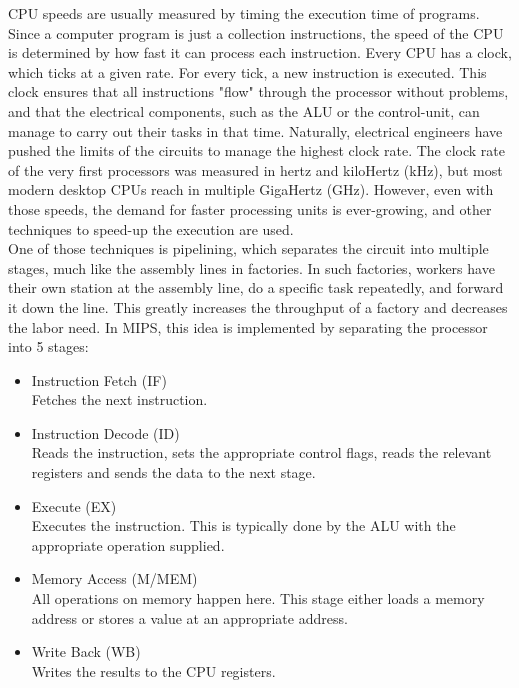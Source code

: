 CPU speeds are usually measured by timing the execution time of programs. Since
a computer program is just a collection instructions, the speed of the CPU is
determined by how fast it can process each instruction.
Every CPU has a clock, which ticks at a given rate. For every tick, a new
instruction is executed. This clock ensures that all instructions "flow" through
the processor without problems, and that the electrical components, such as the
ALU or the control-unit, can manage to carry out their tasks in that time.
Naturally, electrical engineers have pushed the limits of the circuits to manage
the highest clock rate. The clock rate of the very first processors was measured
in hertz and kiloHertz (kHz), but most modern desktop CPUs reach in multiple
GigaHertz (GHz)\cite{wiki:clock_rate}. However, even with those speeds, the
demand for faster processing units is ever-growing, and other techniques to speed-up
the execution are used.\\
One of those techniques is pipelining, which separates the circuit into multiple
stages, much like the assembly lines in factories. In such factories, workers
have their own station at the assembly line, do a specific task repeatedly, and
forward it down the line. This greatly increases the throughput of a factory and
decreases the labor need.
In MIPS, this idea is implemented by separating the processor into 5 stages\cite{COD5}:
\begin{itemize}
	\item Instruction Fetch (IF)\\
Fetches the next instruction.

	\item Instruction Decode (ID)\\
Reads the instruction, sets the appropriate control flags, reads the relevant
registers and sends the data to the next stage.

	\item Execute (EX)\\
Executes the instruction. This is typically done by the ALU with the appropriate
operation supplied.

	\item Memory Access (M/MEM)\\
All operations on memory happen here. This stage either loads a memory address
or stores a value at an appropriate address.

	\item Write Back (WB)\\
Writes the results to the CPU registers.
\end{itemize}
